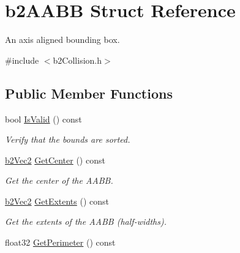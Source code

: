 \hypertarget{structb2_a_a_b_b}{}\section{b2\+A\+A\+BB Struct Reference}
\label{structb2_a_a_b_b}


An axis aligned bounding box.  




{\ttfamily \#include $<$b2\+Collision.\+h$>$}

\subsection*{Public Member Functions}
\begin{DoxyCompactItemize}
\item 
bool \hyperlink{structb2_a_a_b_b_a8d170a2de7a267c3e19f5365685b713d}{Is\+Valid} () const \hypertarget{structb2_a_a_b_b_a8d170a2de7a267c3e19f5365685b713d}{}\label{structb2_a_a_b_b_a8d170a2de7a267c3e19f5365685b713d}

\begin{DoxyCompactList}\small\item\em Verify that the bounds are sorted. \end{DoxyCompactList}\item 
\hyperlink{structb2_vec2}{b2\+Vec2} \hyperlink{structb2_a_a_b_b_aa26703e234bd6fb30fd443cd5001795a}{Get\+Center} () const \hypertarget{structb2_a_a_b_b_aa26703e234bd6fb30fd443cd5001795a}{}\label{structb2_a_a_b_b_aa26703e234bd6fb30fd443cd5001795a}

\begin{DoxyCompactList}\small\item\em Get the center of the A\+A\+BB. \end{DoxyCompactList}\item 
\hyperlink{structb2_vec2}{b2\+Vec2} \hyperlink{structb2_a_a_b_b_aff8b9aa64069a33fe45025299aa0e9b7}{Get\+Extents} () const \hypertarget{structb2_a_a_b_b_aff8b9aa64069a33fe45025299aa0e9b7}{}\label{structb2_a_a_b_b_aff8b9aa64069a33fe45025299aa0e9b7}

\begin{DoxyCompactList}\small\item\em Get the extents of the A\+A\+BB (half-\/widths). \end{DoxyCompactList}\item 
float32 \hyperlink{structb2_a_a_b_b_ace4448c60ef309726e59247a8ae67db5}{Get\+Perimeter} () const \hypertarget{structb2_a_a_b_b_ace4448c60ef309726e59247a8ae67db5}{}\label{structb2_a_a_b_b_ace4448c60ef309726e59247a8ae67db5}


\end{DoxyCompactItemize}

